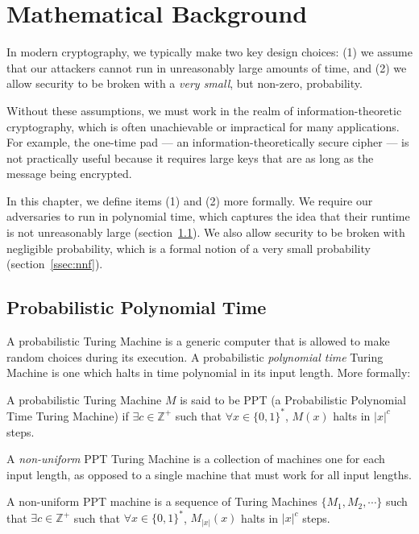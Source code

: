 \chapter{Mathematical Background}
\label{sec:mb}

In modern cryptography, we typically make two key design choices: (1) we assume that our attackers cannot run in unreasonably large amounts of time, and (2) we allow security to be broken with a \emph{very small}, but non-zero, probability.

Without these assumptions, we must work in the realm of information-theoretic cryptography, which is often unachievable or impractical for many applications. For example, the one-time pad --- an information-theoretically secure cipher --- is not practically useful because it requires large keys that are as long as the message being encrypted.

In this chapter, we define items (1) and (2) more formally. We require our adversaries to run in polynomial time, which captures the idea that their runtime is not unreasonably large (section~\ref{ssec:ppt}). We also allow security to be broken with negligible probability, which is a formal notion of a very small probability (section~\ref{ssec:nnf}). 


\section{Probabilistic Polynomial Time}
\label{ssec:ppt}
A probabilistic Turing Machine is a generic computer that is allowed to make random choices during its execution. A probabilistic \textit{polynomial time} Turing Machine is one which halts in time polynomial in its input length. More formally:

\begin{definition}
A probabilistic Turing Machine $M$ is said to be PPT (a Probabilistic Polynomial Time Turing Machine) if $\exists c \in \mathbb{Z}^+$ such that $\forall x \in\{0,1\}^*$, $M(x)$ halts in $|x|^c$ steps.
\end{definition}

A {\em non-uniform} PPT Turing Machine is a collection of machines one for each input length, as opposed to a single machine that must work for all input lengths.

\begin{definition}
A non-uniform PPT machine is a sequence of Turing Machines $\{ M_1, M_2, \cdots \}$ such that $\exists c \in \mathbb{Z}^+$ such that $\forall x \in\{0,1\}^*$, $M_{|x|}(x)$ halts in $|x|^c$ steps.
\end{definition}



